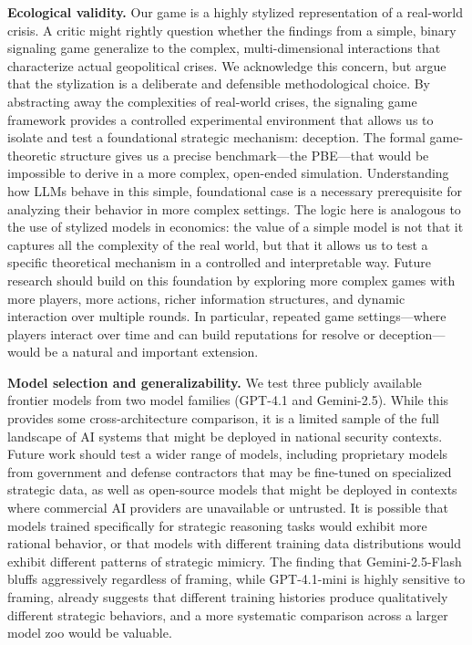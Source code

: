 \documentclass[12pt]{article}
\theoremstyle{plain}
\theoremstyle{definition}
\begin{document}
\textbf{Ecological validity.} Our game is a highly stylized representation of a real-world crisis. A critic might rightly question whether the findings from a simple, binary signaling game generalize to the complex, multi-dimensional interactions that characterize actual geopolitical crises. We acknowledge this concern, but argue that the stylization is a deliberate and defensible methodological choice. By abstracting away the complexities of real-world crises, the signaling game framework provides a controlled experimental environment that allows us to isolate and test a foundational strategic mechanism: deception. The formal game-theoretic structure gives us a precise benchmark---the PBE---that would be impossible to derive in a more complex, open-ended simulation. Understanding how LLMs behave in this simple, foundational case is a necessary prerequisite for analyzing their behavior in more complex settings. The logic here is analogous to the use of stylized models in economics: the value of a simple model is not that it captures all the complexity of the real world, but that it allows us to test a specific theoretical mechanism in a controlled and interpretable way. Future research should build on this foundation by exploring more complex games with more players, more actions, richer information structures, and dynamic interaction over multiple rounds. In particular, repeated game settings---where players interact over time and can build reputations for resolve or deception---would be a natural and important extension.

\textbf{Model selection and generalizability.} We test three publicly available frontier models from two model families (GPT-4.1 and Gemini-2.5). While this provides some cross-architecture comparison, it is a limited sample of the full landscape of AI systems that might be deployed in national security contexts. Future work should test a wider range of models, including proprietary models from government and defense contractors that may be fine-tuned on specialized strategic data, as well as open-source models that might be deployed in contexts where commercial AI providers are unavailable or untrusted. It is possible that models trained specifically for strategic reasoning tasks would exhibit more rational behavior, or that models with different training data distributions would exhibit different patterns of strategic mimicry. The finding that Gemini-2.5-Flash bluffs aggressively regardless of framing, while GPT-4.1-mini is highly sensitive to framing, already suggests that different training histories produce qualitatively different strategic behaviors, and a more systematic comparison across a larger model zoo would be valuable.
\end{document}
